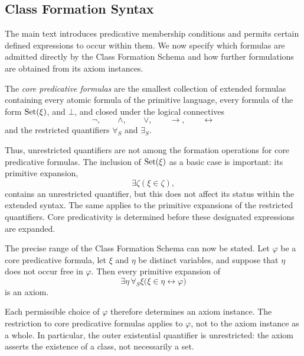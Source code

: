 \subsection{Class Formation Syntax}
\label{sec:technical-class-formation}

The main text introduces predicative membership conditions and permits certain defined expressions to occur within them. We now specify which formulas are admitted directly by the Class Formation Schema and how further formulations are obtained from its axiom instances.


\begin{definition}
\label{def:core-predicative-formulas}
The \emph{core predicative formulas} are the smallest collection of extended formulas containing every atomic formula of the primitive language, every formula of the form \(\operatorname{Set}(\xi)\), and \(\bot\), and closed under the logical connectives
\[
\neg,\qquad \land,\qquad \lor,\qquad \to,\qquad \leftrightarrow
\]
and the restricted quantifiers \(\forall_S\) and \(\exists_S\).
\end{definition}

Thus, unrestricted quantifiers are not among the formation operations for core predicative formulas. The inclusion of \(\operatorname{Set}(\xi)\) as a basic case is important: its primitive expansion,
\[
\exists\zeta(\xi\in\zeta),
\]
contains an unrestricted quantifier, but this does not affect its status within the extended syntax. The same applies to the primitive expansions of the restricted quantifiers. Core predicativity is determined before these designated expressions are expanded.


The precise range of the Class Formation Schema can now be stated. Let \(\varphi\) be a core predicative formula, let \(\xi\) and \(\eta\) be distinct variables, and suppose that \(\eta\) does not occur free in \(\varphi\). Then every primitive expansion of
\[
\exists\eta\,\forall_S\xi
\bigl(
\xi\in\eta\leftrightarrow\varphi
\bigr)
\]
is an axiom.

Each permissible choice of \(\varphi\) therefore determines an axiom instance. The restriction to core predicative formulas applies to \(\varphi\), not to the axiom instance as a whole. In particular, the outer existential quantifier is unrestricted: the axiom asserts the existence of a class, not necessarily a set.

